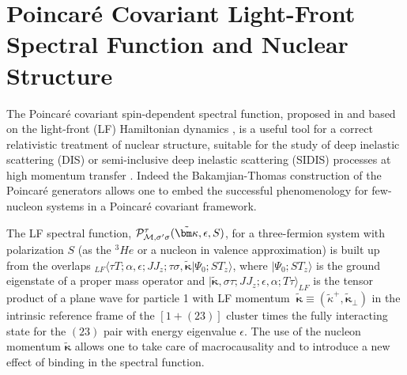 \section{Poincar\'e Covariant Light-Front Spectral Function and Nuclear Structure}
\vspace{-1mm}
{The Poincar\'e covariant spin-dependent spectral function, proposed in \cite{LFSF} and based on  the light-front (LF) Hamiltonian dynamics \cite{Dirac,KP},  is a useful tool for a correct relativistic treatment  of nuclear structure, suitable for the study of deep inelastic scattering (DIS) or semi-inclusive deep inelastic scattering (SIDIS) processes at high momentum transfer \cite{mar,sid1,sid2}.}
 {Indeed the Bakamjian-Thomas construction \cite{BT} of the Poincar\'e generators 
  allows one to embed the successful phenomenology for few-nucleon systems in a
Poincar\'e covariant framework.}

The LF spectral function, ${{\cal P}^{\tau}_{{\cal M},\sigma'\sigma}({ \tilde {\bm \kappa}},\epsilon,S)}$,
for a three-fermion system with polarization $S$ (as the $^3He$ or a nucleon in valence approximation) is built up from the overlaps $_{LF}\langle  \tau T ; 
\alpha,\epsilon ;J J_{z}; \tau\sigma,\tilde{\bm \kappa}|\Psi_{0}; S T_z \rangle$, where $|\Psi_{0}; S T_z \rangle$ is the ground eigenstate of a proper mass operator \cite{LFSF} and 
$|\tilde{\bm \kappa}, \sigma \tau; J_{} J_{z}; \epsilon,\alpha;T \tau \rangle_{LF}$ is the tensor product of a plane wave for particle 1 with LF momentum $~ \tilde{\bm \kappa} \equiv (\tilde{\kappa}^+,{\tilde{\bm \kappa}_\perp})$ in the {{intrinsic reference frame of the $[1+(23)]$ cluster}} 
 times the fully interacting  state for {the} $(23)$ pair with  energy eigenvalue $\epsilon$.
{{The use of the nucleon momentum {{${\tilde{\bm \kappa}}$}}
   allows one  to take care of macrocausality \cite{KP} and  to introduce 
   {{a new effect of binding in the spectral function.}}}}

